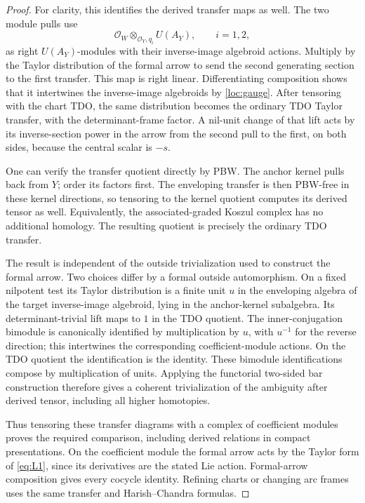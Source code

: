 \documentclass[11pt]{article}
\numberwithin{equation}{section}
\theoremstyle{definition}
\theoremstyle{remark}
\begin{document}
\begin{proof}
For clarity, this identifies the derived transfer maps as well.
The two module pulls use
\[
 \mathcal O_W\otimes_{\mathcal O_Y,q_i}U(A_Y),\qquad i=1,2,
\]
as right $U(A_Y)$-modules with their inverse-image algebroid actions.
Multiply by the Taylor distribution of the formal arrow to send the
second generating section to the first transfer.  This map is right
linear.  Differentiating composition shows that it intertwines the
inverse-image algebroids by \eqref{loc:gauge}.  After tensoring with
the chart TDO, the same distribution becomes the ordinary TDO Taylor
transfer, with the determinant-frame factor.  A nil-unit change of
that lift acts by its inverse-section power in the arrow from the
second pull to the first, on both sides, because the central scalar is
$-s$.

One can verify the transfer quotient directly by PBW.  The anchor
kernel pulls back from $Y$; order its factors first.  The enveloping
transfer is then PBW-free in these kernel directions, so tensoring to
the kernel quotient computes its derived tensor as well.  Equivalently,
the associated-graded Koszul complex has no additional homology.
The resulting quotient is precisely the ordinary TDO transfer.

The result is independent of the outside trivialization used to
construct the formal arrow.  Two choices differ by a formal outside
automorphism.  On a fixed nilpotent test its Taylor distribution is
a finite unit $u$ in the enveloping algebra of the target
inverse-image algebroid, lying in the anchor-kernel subalgebra.
Its determinant-trivial lift maps to $1$ in the TDO quotient.
The inner-conjugation bimodule is canonically identified by
multiplication by $u$, with $u^{-1}$ for the reverse direction;
this intertwines the corresponding coefficient-module actions.
On the TDO quotient the identification is the identity.  These
bimodule identifications compose by multiplication of units.
Applying the functorial two-sided bar construction therefore gives
a coherent trivialization of the ambiguity after derived tensor,
including all higher homotopies.

Thus tensoring these transfer diagrams with a complex of coefficient
modules proves the required comparison, including derived relations
in compact presentations.  On the coefficient module the formal
arrow acts by the Taylor form of \eqref{eq:L1}, since its derivatives
are the stated Lie action.  Formal-arrow composition gives every
cocycle identity.  Refining charts or changing arc frames uses the
same transfer and Harish--Chandra formulas.


\end{proof}
\end{document}
